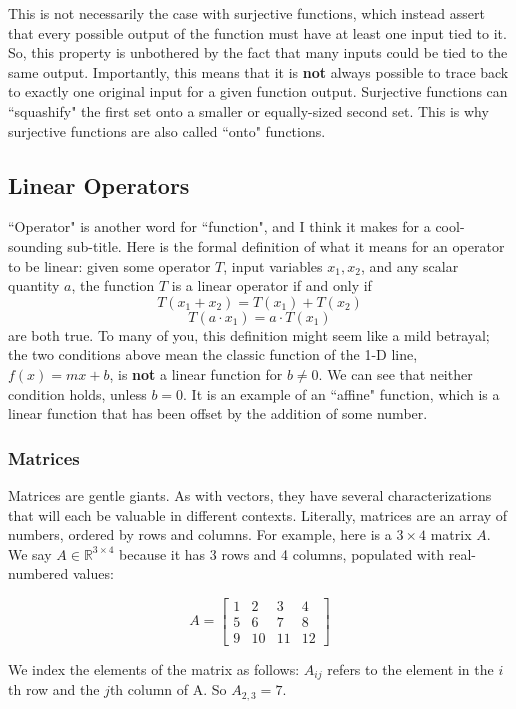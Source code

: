 \documentclass{article}
\begin{document}
This is not necessarily the case with surjective functions, which instead assert that every possible output of the function must have at least one input tied to it. So, this property is unbothered by the fact that many inputs could be tied to the same output. Importantly, this means that it is \textbf{not} always possible to trace back to exactly one original input for a given function output. Surjective functions can ``squashify" the first set onto a smaller or equally-sized second set. This is why surjective functions are also called ``onto" functions.

\subsection{Linear Operators}
``Operator" is another word for ``function", and I think it makes for a cool-sounding sub-title. Here is the formal definition of what it means for an operator to be linear: given some operator $T$, input variables $x_1, x_2$, and any scalar quantity $a$, the function $T$ is a linear operator if and only if\\

\[T(x_1 + x_2) = T(x_1) + T(x_2)\]
\[T(a\cdot x_1) = a\cdot T(x_1)\]
are both true. To many of you, this definition might seem like a mild betrayal; the two conditions above mean the classic function of the 1-D line, $f(x) = mx + b$, is \textbf{not} a linear function for $b \neq 0$. We can see that neither condition holds, unless $b = 0$. It is an example of an ``affine" function, which is a linear function that has been offset by the addition of some number.

\subsubsection{Matrices}
Matrices are gentle giants. As with vectors, they have several characterizations that will each be valuable in different contexts. Literally, matrices are an array of numbers, ordered by rows and columns. For example, here is a $3\times 4$ matrix $A$. We say $A \in \mathbb{R}^{3 \times 4}$ because it has 3 rows and 4 columns, populated with real-numbered values:

\[A = \begin{bmatrix}
    1 & 2 & 3 & 4 \\
    5 & 6 & 7 & 8 \\
    9 & 10 & 11 & 12
\end{bmatrix}\]

We index the elements of the matrix as follows: $A_{ij}$ refers to the element in the $i$th row and the $j$th column of A. So $A_{2, 3} = 7$. \\
\end{document}

